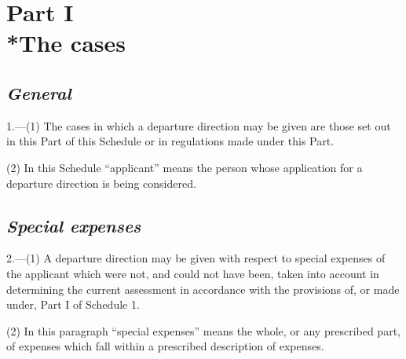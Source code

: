 \documentclass[12pt,a4paper]{article}
\begin{document}
\section[Part I --- The cases]{Part I\\*The cases}

\renewcommand\parthead{--- Schedule 4B Part I}

\subsection*{\itshape General}

1.---(1) The cases in which a departure direction may be given are those set out in this Part of this Schedule or in regulations made under this Part.

(2) In this Schedule “applicant” means the person whose application for a departure direction is being considered.

\subsection*{\itshape Special expenses}

2.---(1) A departure direction may be given with respect to special expenses of the applicant which were not, and could not have been, taken into account in determining the current assessment in accordance with the provisions of, or made under, Part I of Schedule 1.

(2) In this paragraph “special expenses” means the whole, or any prescribed part, of expenses which fall within a prescribed description of expenses.
\end{document}
